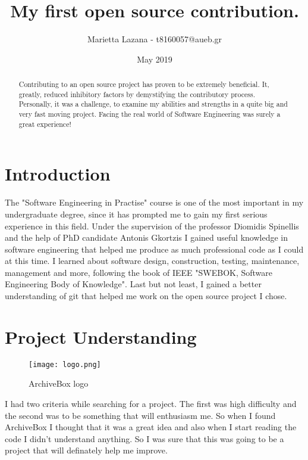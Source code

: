 \documentclass{article}
\title{My first open source contribution.}
\author{Marietta Lazana - t8160057@aueb.gr}
\date{May 2019}
\begin{document}
\maketitle

\begin{abstract}
Contributing to an open source project has proven to be extremely beneficial. It, greatly, reduced inhibitory factors by demystifying the contributory process. Personally, it was a challenge, to examine my abilities and strengths in a quite big and very fast moving project. Facing the real world of Software Engineering was surely a great experience!
  
\end{abstract}

\section*{Introduction}
The "Software Engineering in Practise" course is one of the most important in my undergraduate degree, since it has prompted me to gain my first serious experience in this field. Under the supervision of the professor Diomidis Spinellis and the help of PhD candidate Antonis Gkortzis I gained useful knowledge in software engineering that helped me produce as much professional code as I could at this time. I learned about software design, construction, testing, maintenance, management and more, following the book of IEEE "SWEBOK, Software Engineering  Body of Knowledge". Last but not least, I gained a better understanding of git that helped me work on the open source project I chose.

\section{Project Understanding}

\begin{figure}[tph!]
\centerline{\texttt{[image: logo.png]}}
    \caption{ArchiveBox logo}
    \label{fig:verticalcell}
\end{figure}

I had two criteria while searching for a project. The first was high difficulty and the second was to be something that will enthusiasm me. So when I found ArchiveBox I thought that it was a great idea and also when I start reading the code I didn't understand anything. So I was sure that this was going to be a project that will definately help me improve.
\end{document}
